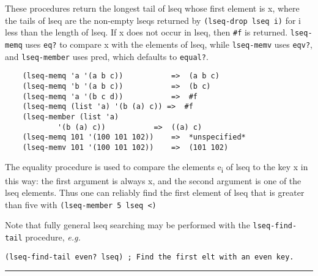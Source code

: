 \begin{entry}{%
  }

  These procedures return the longest tail of lseq whose first element
  is x, where the tails of lseq are the non-empty lseqs returned by
  \texttt{(lseq-drop\ lseq\ i)} for i less than the length of lseq. If
  x does not occur in lseq, then \texttt{\#f} is returned.
  \texttt{lseq-memq} uses \texttt{eq?} to compare x with the elements
  of lseq, while \texttt{lseq-memv} uses \texttt{eqv?}, and
  \texttt{lseq-member} uses pred, which defaults to \texttt{equal?}.

\begin{verbatim}
    (lseq-memq 'a '(a b c))           =>  (a b c)
    (lseq-memq 'b '(a b c))           =>  (b c)
    (lseq-memq 'a '(b c d))           =>  #f
    (lseq-memq (list 'a) '(b (a) c)) =>  #f
    (lseq-member (list 'a)
            '(b (a) c))           =>  ((a) c)
    (lseq-memq 101 '(100 101 102))    =>  *unspecified*
    (lseq-memv 101 '(100 101 102))    =>  (101 102)
\end{verbatim}

  The equality procedure is used to compare the elements
  e\textsubscript{i} of lseq to the key x in this way: the first
  argument is always x, and the second argument is one of the lseq
  elements. Thus one can reliably find the first element of lseq that
  is greater than five with \texttt{(lseq-member\ 5\ lseq\
    \textless{})}

  Note that fully general lseq searching may be performed with the
  \texttt{lseq-find-tail} procedure, \emph{e.g.}

\begin{verbatim}
(lseq-find-tail even? lseq) ; Find the first elt with an even key.
\end{verbatim}
\end{entry}

\begin{center}\rule{0.5\linewidth}{\linethickness}\end{center}
